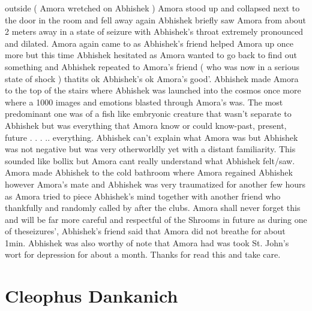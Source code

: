 \documentclass[12pt]{book}
\begin{document}
outside ( Amora wretched on Abhishek ) Amora stood up and collapsed next to the door in the room and fell away again Abhishek briefly saw Amora from about 2 meters away in a state of seizure with Abhishek's throat extremely pronounced and dilated. Amora again came to as Abhishek's friend helped Amora up once more but this time Abhishek hesitated as Amora wanted to go back to find out something and Abhishek repeated to Amora's friend ( who was now in a serious state of shock ) thatits ok Abhishek's ok Amora's good'. Abhishek made Amora to the top of the stairs where Abhishek was launched into the cosmos once more where a 1000 images and emotions blasted through Amora's was. The most predominant one was of a fish like embryonic creature that wasn't separate to Abhishek but was everything that Amora know or could know-past, present, future . . . .. everything. Abhishek can't explain what Amora was but Abhishek was not negative but was very otherworldly yet with a distant familiarity. This sounded like bollix but Amora cant really understand what Abhishek felt/saw. Amora made Abhishek to the cold bathroom where Amora regained Abhishek however Amora's mate and Abhishek was very traumatized for another few hours as Amora tried to piece Abhishek's mind together with another friend who thankfully and randomly called by after the clubs. Amora shall never forget this and will be far more careful and respectful of the Shrooms in future as during one of theseizures', Abhishek's friend said that Amora did not breathe for about 1min. Abhishek was also worthy of note that Amora had was took St. John's wort for depression for about a month. Thanks for read this and take care.



\chapter{Cleophus Dankanich}
\end{document}
